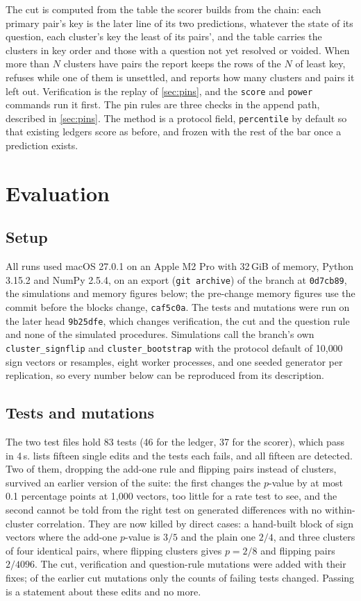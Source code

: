 \documentclass[11pt]{article}
\theoremstyle{plain}
\theoremstyle{definition}
\theoremstyle{remark}
\begin{document}
The cut is computed from the table the scorer builds from the chain: each primary pair's key is the
later line of its two predictions, whatever the state of its question, each cluster's key the
least of its pairs', and the table carries the clusters in key order and those with a question not
yet resolved or voided. When more than $N$ clusters have pairs the report keeps the rows of the $N$
of least key, refuses while one of them is unsettled, and reports how many clusters and pairs it
left out. Verification is the replay of \cref{sec:pins}, and the \texttt{score} and \texttt{power}
commands run it first. The pin rules are three checks in the append path, described in \cref{sec:pins}. The
method is a protocol field, \texttt{percentile} by default so that existing ledgers score as
before, and frozen with the rest of the bar once a prediction exists.

\section{Evaluation}\label{sec:eval}

\subsection{Setup}
All runs used macOS 27.0.1 on an Apple M2 Pro with 32\,GiB of memory, Python 3.15.2 and NumPy
2.5.4, on an export (\texttt{git archive}) of the branch at \texttt{0d7cb89}, the simulations and memory
figures below; the pre-change memory figures use the commit before the blocks change,
\texttt{caf5c0a}. The tests and mutations were run on the later head \texttt{9b25dfe}, which changes
verification, the cut and the question rule and none of the simulated procedures. Simulations call the
branch's own \texttt{cluster\_signflip} and \texttt{cluster\_bootstrap} with the protocol default
of 10{,}000 sign vectors or resamples, eight worker processes, and one seeded generator per
replication, so every number below can be reproduced from its description.

\subsection{Tests and mutations}
The two test files hold 83 tests (46 for the ledger, 37 for the scorer), which pass in 4\,s.
 lists fifteen single edits and the tests each fails, and all fifteen are
detected. Two of them, dropping the add-one rule and flipping pairs instead of clusters, survived
an earlier version of the suite: the first changes the $p$-value by at most 0.1 percentage points at
1{,}000 vectors, too little for a rate test to see, and the second cannot be told from the right
test on generated differences with no within-cluster correlation. They are now killed by direct
cases: a hand-built block of sign vectors where the add-one $p$-value is $3/5$ and the plain one
$2/4$, and three clusters of four identical pairs, where flipping clusters gives $p = 2/8$ and
flipping pairs $2/4096$. The cut, verification and question-rule mutations were added with their fixes; of the
earlier cut mutations only the counts of failing tests changed. Passing is a statement about these
edits and no more.
\end{document}
